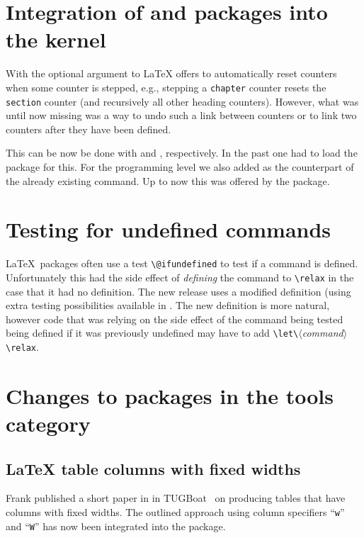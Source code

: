 \documentclass{ltnews}
\providecommand\meta[1]{$\langle$\textit{#1}$\rangle$}
\begin{document}
\section{Integration of  and  packages 
         into the kernel}

With the optional argument to  \LaTeX{} offers to
automatically reset counters when some counter is stepped, e.g.,
stepping a \texttt{chapter} counter resets the \texttt{section}
counter (and recursively all other heading counters). However, what
was until now missing was a way to undo such a link between counters
or to link two counters after they have been defined.

This can be now be done with  and ,
respectively. In the past one had to load the  package
for this. For the programming level we also added
 as the counterpart of the already existing
 command. Up to now this was offered by the
 package.

\section{Testing for undefined commands}
\LaTeX\ packages often use a test \verb|\@ifundefined| to test if a command
is defined. Unfortunately this had the side effect of \emph{defining}
the command to \verb|\relax| in the case that it had no definition.
 The new release uses a modified definition
(using extra testing possibilities available in . The new definition
is more natural, however code that was relying on the side effect of the
command being tested being defined if it was previously undefined may have to add
\verb|\let\|\meta{command}\verb|\relax|.


\section{Changes to packages in the tools category}

\subsection{\LaTeX{} table columns with fixed widths}

Frank published a short paper in in
TUGBoat~\cite{Mittelbach:TB38-2-213} on producing tables that have
columns with fixed widths. The outlined approach using column
specifiers ``\texttt{w}'' and ``\texttt{W}'' has now been integrated
into the  package.
\end{document}
